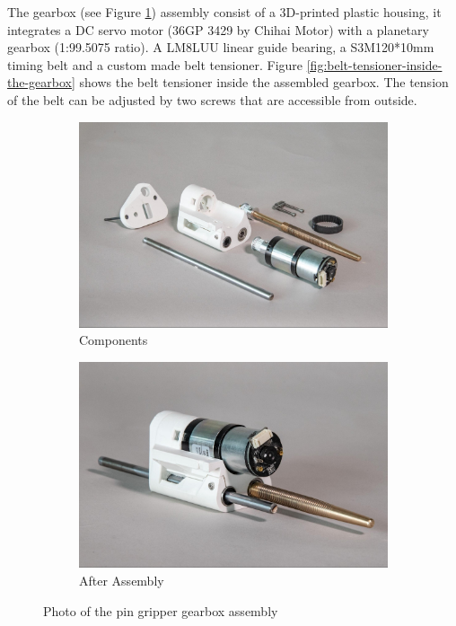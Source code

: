 The gearbox (see Figure \ref{fig:pin-gripper-gearbox-assembly}) assembly consist of a 3D-printed plastic housing, it integrates a DC servo motor (36GP 3429 by Chihai Motor) with a planetary gearbox (1:99.5075 ratio). A LM8LUU linear guide bearing, a S3M120*10mm timing belt and a custom made belt tensioner. Figure \ref{fig:belt-tensioner-inside-the-gearbox} shows the belt tensioner inside the assembled gearbox. The tension of the belt can be adjusted by two screws that are accessible from outside.

\begin{figure}[!h]
    \centering
    \begin{subfigure}[b]{0.49\textwidth}
        \centering
        \includegraphics[width=\textwidth]{images/7a/img45.jpg}
        \caption{Components}
    \end{subfigure}
    \hfill
    \begin{subfigure}[b]{0.49\textwidth}
        \centering
        \includegraphics[width=\textwidth]{images/7a/img46.jpg}
        \caption{After Assembly}
    \end{subfigure}
    \caption{Photo of the pin gripper gearbox assembly}
    \label{fig:pin-gripper-gearbox-assembly}
\end{figure}

